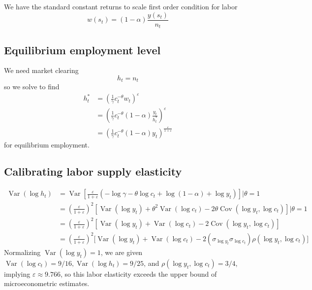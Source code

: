 \documentclass[11pt]{amsart}
\begin{document}
We have the standard constant returns to scale first order condition for labor 
\[
w(s_t) = (1-\alpha) \frac{y(s_t)}{n_t}
\]

\subsection{Equilibrium employment level}
We need market clearing 
\[
h_t = n_t
\] 
so we solve to find
\begin{align*}
h_t^{*} &= \left( \frac{1}{\gamma} c_t^{-\theta} w_t \right)^\varepsilon \\
&= \left( \frac{1}{\gamma} c_t^{-\theta} (1-\alpha) \frac{y_t}{h_t^{*}} \right)^\varepsilon \\
&= \left(  \frac{1}{\gamma} c_t^{-\theta} (1-\alpha) y_t  \right)^{\frac{\varepsilon}{1+\varepsilon}}
\end{align*}
for equilibrium employment.

\subsection{Calibrating labor supply elasticity}

\begin{align*}
\operatorname{Var}(\log h_t) &= \operatorname{Var} \left[ \frac{\varepsilon}{1+\varepsilon} \left( -\log \gamma -\theta \log c_t + \log (1-\alpha) + \log y_t  \right) \right] \vert \theta = 1 \\
& = \left( \frac{\varepsilon}{1+ \varepsilon}\right)^2 \left[ \operatorname{Var}(\log y_t) + \theta^2 \operatorname{Var}(\log c_t) - 2\theta \operatorname{Cov}(\log y_t, \log c_t) \right] \vert \theta = 1\\
& = \left( \frac{\varepsilon}{1+ \varepsilon}\right)^2 \left[ \operatorname{Var}(\log y_t) +  \operatorname{Var}(\log c_t) - 2 \operatorname{Cov}(\log y_t, \log c_t) \right] \\
& = \left( \frac{\varepsilon}{1+ \varepsilon}\right)^2 \Bigg[ \operatorname{Var}(\log y_t) +  \operatorname{Var}(\log c_t) - 2 \left( \sigma_{\log y_t} \sigma_{\log c_t} \right)\rho(\log y_t, \log c_t) \Bigg]
\end{align*}
Normalizing $\operatorname{Var}(\log y_t) = 1$, we are given $\operatorname{Var}(\log c_t) = 9/16, \operatorname{Var}(\log h_t) = 9/25$, and $\rho(\log y_t, \log c_t) = 3/4$, implying $\varepsilon \approx 9.766$, so this labor elasticity exceeds the upper bound of microeconometric estimates.
\end{document}
